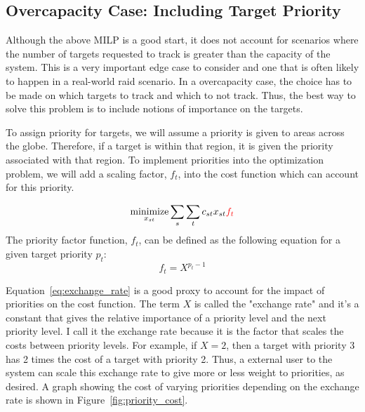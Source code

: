 \subsection{Overcapacity Case: Including Target Priority}


     Although the above MILP is a good start, it does not account for scenarios where the number of targets requested to track is greater than the capacity of the system. 
     This is a very important edge case to consider and one that is often likely to happen in a real-world raid scenario.
     In a overcapacity case, the choice has to be made on which targets to track and which to not track. 
     Thus, the best way to solve this problem is to include notions of importance on the targets.

     To assign priority for targets, we will assume a priority is given to areas across the globe. Therefore, if a target is within that region, it is given the priority associated with that region.
     To implement priorities into the optimization problem, we will add a scaling factor, $f_{t}$, into the cost function which can account for this priority.
    
     \begin{equation}
        \underset{x_{st}}{\text{minimize}} \sum_{s} \sum_{t} c_{st} x_{st} \textcolor{red}{f_{t}}
        \label{eq:objective_priority}
    \end{equation}
    The priority factor function, $f_{t}$, can be defined as the following equation for a given target priority $p_{t}$:
    \begin{equation}
        f_{t} = X^{p_{t} - 1}
        \label{eq:exchange_rate}
    \end{equation}

    Equation~\eqref{eq:exchange_rate} is a good proxy to account for the impact of priorities on the cost function.
    The term $X$ is called the "exchange rate" and it's a constant that gives the relative importance of a priority level and the next priority level.
    I call it the exchange rate because it is the factor that scales the costs between priority levels.
    For example, if $X = 2$, then a target with priority 3 has 2 times the cost of a target with priority 2.
    Thus, a external user to the system can scale this exchange rate to give more or less weight to priorities, as desired.
    A graph showing the cost of varying priorities depending on the exchange rate is shown in Figure~\ref{fig:priority_cost}.
    

